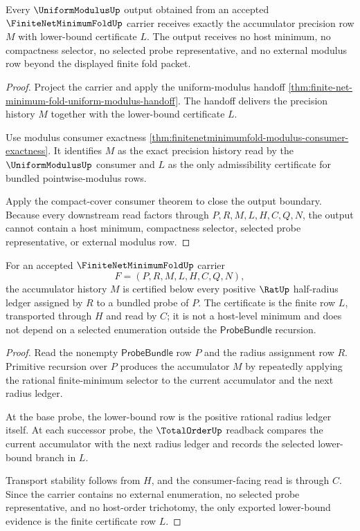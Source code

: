 \begin{theorem}
\label{thm:finitenetminimumfold-uniformmodulus-output-exhaustion}
Every $\UniformModulusUp$ output obtained from an accepted $\FiniteNetMinimumFoldUp$ carrier receives exactly the accumulator precision row $M$ with lower-bound certificate $L$. The output receives no host minimum, no compactness selector, no selected probe representative, and no external modulus row beyond the displayed finite fold packet.
\end{theorem}
\begin{proof}
Project the carrier and apply the uniform-modulus handoff \autoref{thm:finite-net-minimum-fold-uniform-modulus-handoff}. The handoff delivers the precision history $M$ together with the lower-bound certificate $L$.

Use modulus consumer exactness \autoref{thm:finitenetminimumfold-modulus-consumer-exactness}. It identifies $M$ as the exact precision history read by the $\UniformModulusUp$ consumer and $L$ as the only admissibility certificate for bundled pointwise-modulus rows.

Apply the compact-cover consumer theorem to close the output boundary. Because every downstream read factors through $P,R,M,L,H,C,Q,N$, the output cannot contain a host minimum, compactness selector, selected probe representative, or external modulus row.
\end{proof}

\begin{theorem}
\label{thm:finite-net-minimum-fold-lower-bound-certificate}
For an accepted $\FiniteNetMinimumFoldUp$ carrier
$$
F=(P,R,M,L,H,C,Q,N),
$$
the accumulator history $M$ is certified below every positive $\RatUp$ half-radius ledger assigned by $R$ to a bundled probe of $P$. The certificate is the finite row $L$, transported through $H$ and read by $C$; it is not a host-level minimum and does not depend on a selected enumeration outside the $\mathsf{ProbeBundle}$ recursion.
\end{theorem}
\begin{proof}
Read the nonempty $\mathsf{ProbeBundle}$ row $P$ and the radius assignment row $R$. Primitive recursion over $P$ produces the accumulator $M$ by repeatedly applying the rational finite-minimum selector to the current accumulator and the next radius ledger.

At the base probe, the lower-bound row is the positive rational radius ledger itself. At each successor probe, the $\TotalOrderUp$ readback compares the current accumulator with the next radius ledger and records the selected lower-bound branch in $L$.

Transport stability follows from $H$, and the consumer-facing read is through $C$. Since the carrier contains no external enumeration, no selected probe representative, and no host-order trichotomy, the only exported lower-bound evidence is the finite certificate row $L$.
\end{proof}

